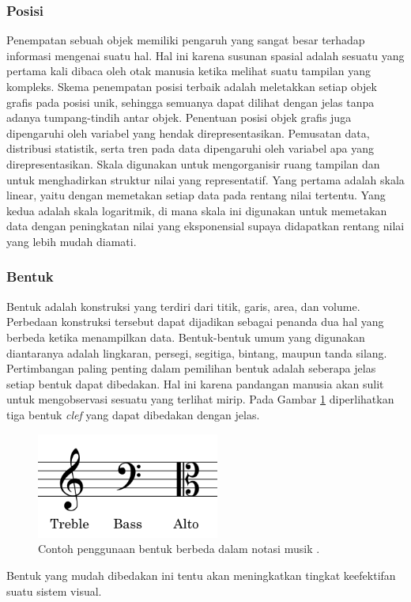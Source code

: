 \subsubsection{Posisi}
Penempatan sebuah objek memiliki pengaruh yang sangat besar terhadap informasi mengenai suatu hal. Hal ini karena susunan spasial adalah sesuatu yang pertama kali dibaca oleh otak manusia ketika melihat suatu tampilan yang kompleks. Skema penempatan posisi terbaik adalah meletakkan setiap objek grafis pada posisi unik, sehingga semuanya dapat dilihat dengan jelas tanpa adanya tumpang-tindih antar objek. Penentuan posisi objek grafis juga dipengaruhi oleh variabel yang hendak direpresentasikan. Pemusatan data, distribusi statistik, serta tren pada data dipengaruhi oleh variabel apa yang direpresentasikan. Skala digunakan untuk mengorganisir ruang tampilan dan untuk menghadirkan struktur nilai yang representatif. Yang pertama adalah skala linear, yaitu dengan memetakan setiap data pada rentang nilai tertentu. Yang kedua adalah skala logaritmik, di mana skala ini digunakan untuk memetakan data dengan peningkatan nilai yang eksponensial supaya didapatkan rentang nilai yang lebih mudah diamati.
\subsubsection{Bentuk}
Bentuk adalah konstruksi yang terdiri dari titik, garis, area, dan volume. Perbedaan konstruksi tersebut dapat dijadikan sebagai penanda dua hal yang berbeda ketika menampilkan data. Bentuk-bentuk umum yang digunakan diantaranya adalah lingkaran, persegi, segitiga, bintang, maupun tanda silang. Pertimbangan paling penting dalam pemilihan bentuk adalah seberapa jelas setiap bentuk dapat dibedakan. Hal ini karena pandangan manusia akan sulit untuk mengobservasi sesuatu yang terlihat mirip. Pada Gambar \ref{fig:clef-macammacam} diperlihatkan tiga bentuk \textit{clef} yang dapat dibedakan dengan jelas.
\begin{figure}[t!]
    \centering
    \includegraphics[width=6cm]{Gambar/clef-macam-macam.jpg}
    \caption{Contoh penggunaan bentuk berbeda dalam notasi musik \cite{bukuTeoriMusik}.}
    \label{fig:clef-macammacam}
\end{figure}
Bentuk yang mudah dibedakan ini tentu akan meningkatkan tingkat keefektifan suatu sistem visual.

